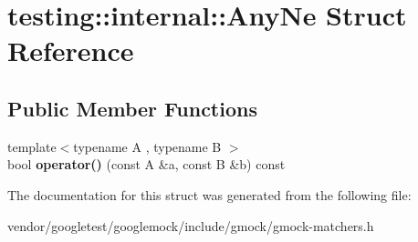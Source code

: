 \hypertarget{structtesting_1_1internal_1_1AnyNe}{}\section{testing\+:\+:internal\+:\+:Any\+Ne Struct Reference}
\label{structtesting_1_1internal_1_1AnyNe}
\subsection*{Public Member Functions}
\begin{DoxyCompactItemize}
\item 
{\footnotesize template$<$typename A , typename B $>$ }\\bool {\bfseries operator()} (const A \&a, const B \&b) const \hypertarget{structtesting_1_1internal_1_1AnyNe_a697a34da8469690f1017da5a76d025fa}{}\label{structtesting_1_1internal_1_1AnyNe_a697a34da8469690f1017da5a76d025fa}

\end{DoxyCompactItemize}


The documentation for this struct was generated from the following file\+:\begin{DoxyCompactItemize}
\item 
vendor/googletest/googlemock/include/gmock/gmock-\/matchers.\+h\end{DoxyCompactItemize}
